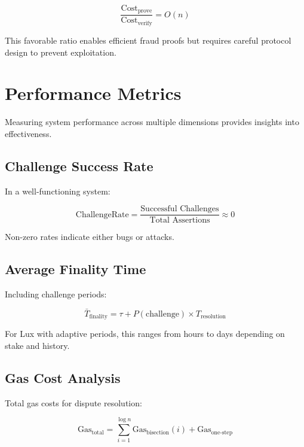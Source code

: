 \documentclass[11pt,a4paper]{article}
\theoremstyle{definition}
\begin{document}
\begin{equation}
\frac{\text{Cost}_{\text{prove}}}{\text{Cost}_{\text{verify}}} = O(n)
\end{equation}

This favorable ratio enables efficient fraud proofs but requires careful protocol design to prevent exploitation.

\section{Performance Metrics}

Measuring system performance across multiple dimensions provides insights into effectiveness.

\subsection{Challenge Success Rate}

In a well-functioning system:

\begin{equation}
\text{ChallengeRate} = \frac{\text{Successful Challenges}}{\text{Total Assertions}} \approx 0
\end{equation}

Non-zero rates indicate either bugs or attacks.

\subsection{Average Finality Time}

Including challenge periods:

\begin{equation}
\bar{T}_{\text{finality}} = \tau + P(\text{challenge}) \times T_{\text{resolution}}
\end{equation}

For Lux with adaptive periods, this ranges from hours to days depending on stake and history.

\subsection{Gas Cost Analysis}

Total gas costs for dispute resolution:

\begin{equation}
\text{Gas}_{\text{total}} = \sum_{i=1}^{\log n} \text{Gas}_{\text{bisection}}(i) + \text{Gas}_{\text{one-step}}
\end{equation}
\end{document}
